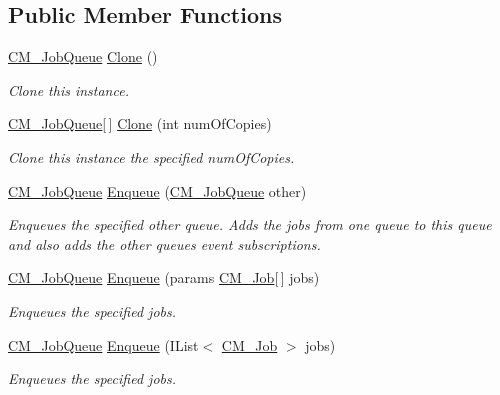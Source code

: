 \subsection*{Public Member Functions}
\begin{DoxyCompactItemize}
\item 
\hyperlink{class_c_m___job_queue}{C\+M\+\_\+\+Job\+Queue} \hyperlink{class_c_m___job_queue_a32411811468c3df358fa1b1dd20da0e9}{Clone} ()
\begin{DoxyCompactList}\small\item\em Clone this instance. \end{DoxyCompactList}\item 
\hyperlink{class_c_m___job_queue}{C\+M\+\_\+\+Job\+Queue}\mbox{[}$\,$\mbox{]} \hyperlink{class_c_m___job_queue_ab9d4d607c63d9099694bbefcf46b0651}{Clone} (int num\+Of\+Copies)
\begin{DoxyCompactList}\small\item\em Clone this instance the specified num\+Of\+Copies. \end{DoxyCompactList}\item 
\hyperlink{class_c_m___job_queue}{C\+M\+\_\+\+Job\+Queue} \hyperlink{class_c_m___job_queue_a5eb3ac10485cd8620f53d38eb413a53d}{Enqueue} (\hyperlink{class_c_m___job_queue}{C\+M\+\_\+\+Job\+Queue} other)
\begin{DoxyCompactList}\small\item\em Enqueues the specified other queue. Adds the jobs from one queue to this queue and also adds the other queues event subscriptions. \end{DoxyCompactList}\item 
\hyperlink{class_c_m___job_queue}{C\+M\+\_\+\+Job\+Queue} \hyperlink{class_c_m___job_queue_a8d85bdcd2a9db1085837622ca6f39fb2}{Enqueue} (params \hyperlink{class_c_m___job}{C\+M\+\_\+\+Job}\mbox{[}$\,$\mbox{]} jobs)
\begin{DoxyCompactList}\small\item\em Enqueues the specified jobs. \end{DoxyCompactList}\item 
\hyperlink{class_c_m___job_queue}{C\+M\+\_\+\+Job\+Queue} \hyperlink{class_c_m___job_queue_a03261e561d34769b869c8f054e7c90d4}{Enqueue} (I\+List$<$ \hyperlink{class_c_m___job}{C\+M\+\_\+\+Job} $>$ jobs)
\begin{DoxyCompactList}\small\item\em Enqueues the specified jobs. \end{DoxyCompactList}\item 

\end{DoxyCompactItemize}
